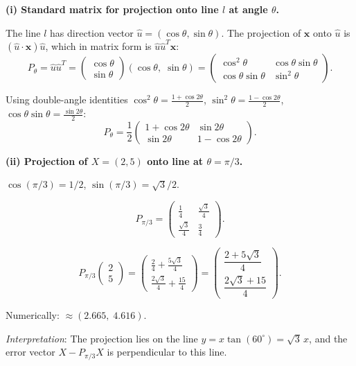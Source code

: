 \documentclass[12pt,a3paper]{article}
\begin{document}
\begin{tcolorbox}[enhanced,breakable,
  colback=cF!4,colframe=cF,boxrule=0.8pt,arc=5pt,
  title={\textbf{Answer --- Projection onto Line at Angle $\theta$; Project $(2,5)$ at $\theta=\pi/3$}},
  fonttitle=\bfseries\color{white},colbacktitle=cF]

\textbf{(i) Standard matrix for projection onto line $l$ at angle $\theta$.}

The line $l$ has direction vector $\hat{u}=(\cos\theta,\sin\theta)$.
The projection of $\mathbf{x}$ onto $\hat{u}$ is $(\hat{u}\cdot\mathbf{x})\hat{u}$, which in matrix form is $\hat{u}\hat{u}^T\mathbf{x}$:
\[
P_\theta = \hat{u}\hat{u}^T = \begin{pmatrix}\cos\theta\\\sin\theta\end{pmatrix}(\cos\theta,\;\sin\theta)
= \begin{pmatrix}\cos^2\theta & \cos\theta\sin\theta \\ \cos\theta\sin\theta & \sin^2\theta\end{pmatrix}.
\]

Using double-angle identities $\cos^2\theta=\frac{1+\cos2\theta}{2}$, $\sin^2\theta=\frac{1-\cos2\theta}{2}$, $\cos\theta\sin\theta=\frac{\sin2\theta}{2}$:
\[
P_\theta = \frac{1}{2}\begin{pmatrix}1+\cos2\theta & \sin2\theta \\ \sin2\theta & 1-\cos2\theta\end{pmatrix}.
\]

\textbf{(ii) Projection of $X=(2,5)$ onto line at $\theta=\pi/3$.}

$\cos(\pi/3)=1/2$, $\sin(\pi/3)=\sqrt{3}/2$.

\[
P_{\pi/3}=\begin{pmatrix}\frac{1}{4}&\frac{\sqrt{3}}{4}\\\frac{\sqrt{3}}{4}&\frac{3}{4}\end{pmatrix}.
\]

\[
P_{\pi/3}\begin{pmatrix}2\\5\end{pmatrix}=\begin{pmatrix}\frac{2}{4}+\frac{5\sqrt{3}}{4}\\\frac{2\sqrt{3}}{4}+\frac{15}{4}\end{pmatrix}=\boxed{\begin{pmatrix}\dfrac{2+5\sqrt{3}}{4}\\[6pt]\dfrac{2\sqrt{3}+15}{4}\end{pmatrix}}.
\]

Numerically: $\approx(2.665,\;4.616)$.

\textit{Interpretation}: The projection lies on the line $y=x\tan(60^\circ)=\sqrt{3}\,x$, and the error vector $X-P_{\pi/3}X$ is perpendicular to this line.

\end{tcolorbox}
\end{document}
